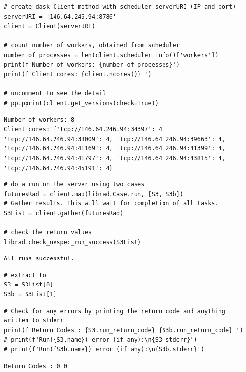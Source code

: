 \begin{lstlisting}[style=tinysize]
# create dask Client method with scheduler serverURI (IP and port)
serverURI = '146.64.246.94:8786'
client = Client(serverURI)

# count number of workers, obtained from scheduler
number_of_processes = len(client.scheduler_info()['workers'])
print(f'Number of workers: {number_of_processes}')
print(f'Client cores: {client.ncores()} ')

# uncomment to see the detail
# pp.pprint(client.get_versions(check=True))

\end{lstlisting}


\begin{lstlisting}[style=outcellstyle]
Number of workers: 8
Client cores: {'tcp://146.64.246.94:34397': 4, 'tcp://146.64.246.94:38009': 4, 'tcp://146.64.246.94:39663': 4, 'tcp://146.64.246.94:41169': 4, 'tcp://146.64.246.94:41399': 4, 'tcp://146.64.246.94:41797': 4, 'tcp://146.64.246.94:43815': 4, 'tcp://146.64.246.94:45191': 4} 

\end{lstlisting}


\begin{lstlisting}[style=tinysize]
# do a run on the server using two cases
futuresRad = client.map(librad.Case.run, [S3, S3b])
# Gather results. This will wait for completion of all tasks.
S3List = client.gather(futuresRad)    

# check the return values
librad.check_uvspec_run_success(S3List)
\end{lstlisting}


\begin{lstlisting}[style=outcellstyle]
All runs successful.

\end{lstlisting}


\begin{lstlisting}[style=tinysize]
# extract to 
S3 = S3List[0]
S3b = S3List[1]
\end{lstlisting}


\begin{lstlisting}[style=tinysize]
# Check for any errors by printing the return code and anything written to stderr
print(f'Return Codes : {S3.run_return_code} {S3b.run_return_code} ')
# print(f'Run({S3.name}) error (if any):\n{S3.stderr}')
# print(f'Run({S3b.name}) error (if any):\n{S3b.stderr}')
\end{lstlisting}


\begin{lstlisting}[style=outcellstyle]
Return Codes : 0 0 

\end{lstlisting}


